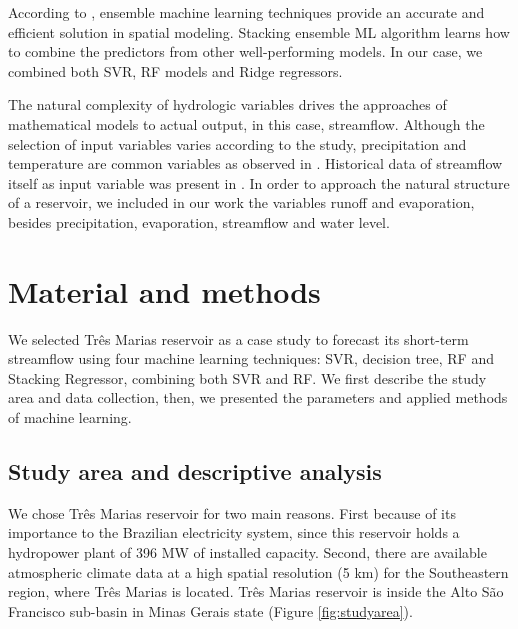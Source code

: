 \documentclass[12pt]{article}
\begin{document}
According to \cite{dou}, ensemble machine learning techniques
provide an accurate and efficient solution in spatial modeling. Stacking ensemble ML algorithm learns how to combine the predictors from other well-performing models. In our case, we combined both SVR, RF models and Ridge regressors.

The natural complexity of hydrologic variables drives the approaches of mathematical models to actual output, in this case, streamflow. Although the selection of input variables varies according to the study, precipitation and temperature are common variables as observed in \cite{kassem2020predicting,essenfelder2020smart,bhatta2019evaluation}. Historical data of streamflow itself as input variable was present in \cite{li}. In order to approach the natural structure of a reservoir, we included in our work the variables runoff and evaporation, besides precipitation, evaporation, streamflow and water level.

\section{Material and methods}

We selected Três Marias reservoir as a case study to forecast its short-term streamflow using four machine learning techniques: SVR, decision tree, RF and Stacking Regressor, combining both SVR and RF. We first describe the study area and data collection, then, we presented the parameters and applied methods of machine learning.

\subsection{Study area and descriptive analysis}
We chose Três Marias reservoir for two main reasons. First because of its importance to the Brazilian electricity system, since this reservoir holds a hydropower plant of 396 MW of installed capacity. Second, there are available atmospheric climate data at a high spatial resolution (5 km) for the Southeastern region, where Três Marias is located. Três Marias reservoir is inside the Alto São Francisco sub-basin in Minas Gerais state (Figure \ref{fig:studyarea}).
\end{document}
